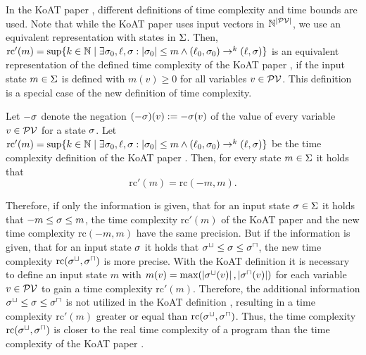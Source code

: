 In the KoAT paper \cite{koat}, different definitions of time complexity and time bounds are used.
Note that while the KoAT paper \cite{koat} uses input vectors in $\mathbb{N}^{\left|\mathcal{PV}\right|}$, we use an equivalent representation with states in $\Sigma$.
Then, $\text{rc}'(m) = \sup \lbrace  k \in \mathbb{N} \mid \exists \sigma_0, \ell, \sigma: \left|\sigma_0\right| \leq m \wedge (\ell_0, \sigma_0) \rightarrow^k (\ell, \sigma)  \rbrace$ is an equivalent representation of the defined time complexity of the KoAT paper \cite{koat}, if the input state $m \in \Sigma$ is defined with $m(v) \geq 0$ for all variables $v \in \mathcal{PV}$.
This definition is a special case of the new definition of time complexity.

\begin{remark}
  Let $-\sigma$ denote the negation $(-\sigma)(v) := -\sigma(v)$ of the value of every variable $v \in \mathcal{PV}$ for a state $\sigma$.
  Let $\text{rc}'(m) = \sup \lbrace  k \in \mathbb{N} \mid \exists \sigma_0, \ell, \sigma: \left|\sigma_0\right| \leq m \wedge (\ell_0, \sigma_0) \rightarrow^k (\ell, \sigma)  \rbrace$ be the time complexity definition of the KoAT paper \cite{koat}.
  Then, for every state $m \in \Sigma$ it holds that
  \[ \text{rc}'(m) = \text{rc}(-m,m). \]
\end{remark}

Therefore, if only the information is given, that for an input state $\sigma \in \Sigma$ it holds that $-m \leq \sigma \leq m$, the time complexity $\text{rc}'(m)$ of the KoAT paper \cite{koat} and the new time complexity $\text{rc}(-m,m)$ have the same precision.
But if the information is given, that for an input state $\sigma$ it holds that ${\sigma^\sqcup} \leq \sigma \leq {\sigma^\sqcap}$, the new time complexity $\text{rc}({\sigma^\sqcup}, {\sigma^\sqcap})$ is more precise.
With the KoAT definition \cite{koat} it is necessary to define an input state $m$ with $m(v) = \max(\left|{\sigma^\sqcup}(v)\right|, \left|{\sigma^\sqcap}(v)\right|)$ for each variable $v \in \mathcal{PV}$ to gain a time complexity $\text{rc}'(m)$.
Therefore, the additional information ${\sigma^\sqcup} \leq \sigma \leq {\sigma^\sqcap}$ is not utilized in the KoAT definition \cite{koat}, resulting in a time complexity $\text{rc}'(m)$ greater or equal than $\text{rc}({\sigma^\sqcup}, {\sigma^\sqcap})$.
Thus, the time complexity $\text{rc}({\sigma^\sqcup}, {\sigma^\sqcap})$ is closer to the real time complexity of a program than the time complexity of the KoAT paper \cite{koat}.

